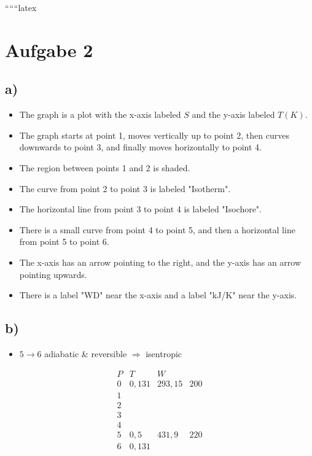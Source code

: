 
``````latex


\section*{Aufgabe 2}

\subsection*{a)}

\begin{itemize}
    \item The graph is a plot with the x-axis labeled \( S \) and the y-axis labeled \( T(K) \).
    \item The graph starts at point 1, moves vertically up to point 2, then curves downwards to point 3, and finally moves horizontally to point 4.
    \item The region between points 1 and 2 is shaded.
    \item The curve from point 2 to point 3 is labeled "Isotherm".
    \item The horizontal line from point 3 to point 4 is labeled "Isochore".
    \item There is a small curve from point 4 to point 5, and then a horizontal line from point 5 to point 6.
    \item The x-axis has an arrow pointing to the right, and the y-axis has an arrow pointing upwards.
    \item There is a label "WD" near the x-axis and a label "kJ/K" near the y-axis.
\end{itemize}

\subsection*{b)}

\begin{itemize}
    \item \( 5 \rightarrow 6 \) adiabatic \& reversible \(\Rightarrow\) isentropic
\end{itemize}

\[
\begin{array}{cccc}
P & T & W \\
0 & 0,131 & 293,15 & 200 \\
1 & & & \\
2 & & & \\
3 & & & \\
4 & & & \\
5 & 0,5 & 431,9 & 220 \\
6 & 0,131 & & \\
\end{array}
\]

